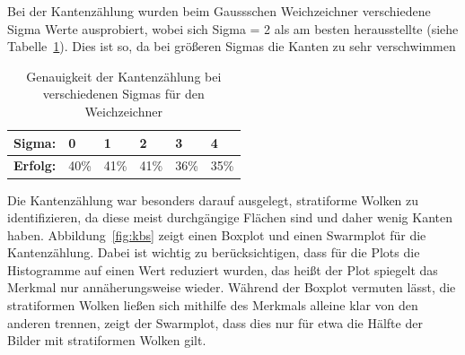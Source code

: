 \documentclass[a4,german]{article}
\begin{document}
Bei der Kantenzählung wurden beim Gaussschen Weichzeichner verschiedene Sigma Werte ausprobiert, wobei sich Sigma = 2 als am besten herausstellte (siehe Tabelle~\ref{tab:sigma}).
Dies ist so, da bei größeren Sigmas die Kanten zu sehr verschwimmen %
\begin{table}[h]
\begin{tabular}{|l|l|l|l|l|l|}
 \hline
 \textbf{Sigma:} & 0 & 1 & 2 & 3 & 4\\
 \hline
 \textbf{Erfolg:} & 40\% & 41\% & 41\% & 36\% & 35\% \\
 \hline
\end{tabular}
\caption{Genauigkeit der Kantenzählung bei verschiedenen Sigmas für den Weichzeichner}
\label{tab:sigma}
\end{table}

Die Kantenzählung war besonders darauf ausgelegt, stratiforme Wolken %
zu identifizieren, da diese meist durchgängige Flächen sind und daher wenig Kanten haben.
Abbildung~\ref{fig:kbs} zeigt einen Boxplot und einen Swarmplot für die Kantenzählung.
Dabei ist wichtig zu berücksichtigen, dass für die Plots die Histogramme auf einen Wert reduziert wurden, das heißt der Plot spiegelt das Merkmal nur annäherungsweise wieder.
Während der Boxplot vermuten lässt, die stratiformen Wolken ließen sich mithilfe des Merkmals alleine klar von den anderen trennen, zeigt der Swarmplot, dass dies nur für etwa die Hälfte der Bilder mit stratiformen Wolken gilt. %
\end{document}
